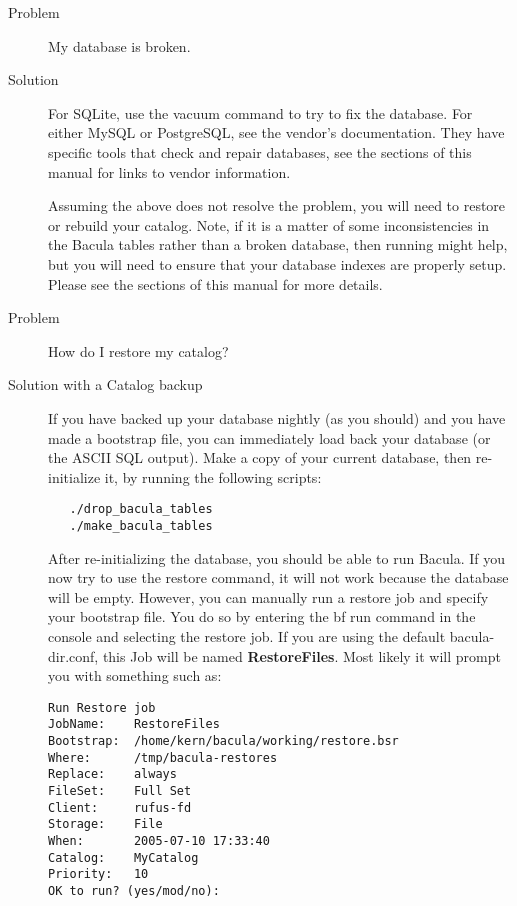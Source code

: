 \begin{description}
\item[Problem]
   My database is broken.
\item[Solution]
   For SQLite, use the vacuum command to try to fix the database. For either
   MySQL or PostgreSQL, see the vendor's documentation. They have specific tools
   that check and repair databases, see the  sections of this manual for links to vendor    
   information.

   Assuming the above does not resolve the problem, you will need to restore
   or rebuild your catalog.  Note, if it is a matter of some
   inconsistencies in the Bacula tables rather than a broken database, then
   running  might help, but you will need to ensure
   that your database indexes are properly setup.  Please see
   the  sections
   of this manual for more details.

\item[Problem]
   How do I restore my catalog?
\item[Solution with a Catalog backup]
   If you have backed up your database nightly (as you should) and you
   have made a bootstrap file, you can immediately load back your
   database (or the ASCII SQL output).  Make a copy of your current
   database, then re-initialize it, by running the following scripts:
\begin{verbatim}
   ./drop_bacula_tables
   ./make_bacula_tables
\end{verbatim}
   After re-initializing the database, you should be able to run 
   Bacula. If you now try to use the restore command, it will not 
   work because the database will be empty. However, you can manually
   run a restore job and specify your bootstrap file. You do so
   by entering the {bf run} command in the console and selecting the
   restore job.  If you are using the default bacula-dir.conf, this
   Job will be named {\bf RestoreFiles}. Most likely it will prompt
   you with something such as:

\footnotesize
\begin{verbatim}
Run Restore job
JobName:    RestoreFiles
Bootstrap:  /home/kern/bacula/working/restore.bsr
Where:      /tmp/bacula-restores
Replace:    always
FileSet:    Full Set
Client:     rufus-fd
Storage:    File
When:       2005-07-10 17:33:40
Catalog:    MyCatalog
Priority:   10
OK to run? (yes/mod/no): 
\end{verbatim}
\normalsize


\end{description}
